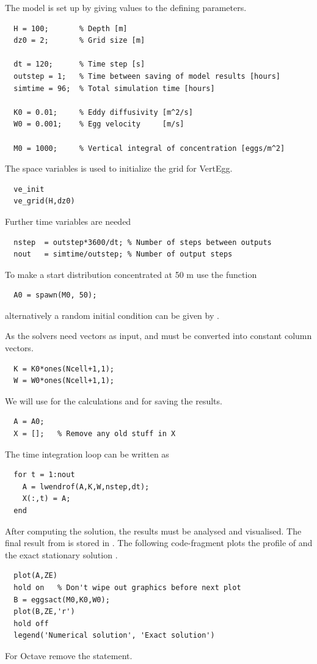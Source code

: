 The model is set up by giving values to the defining  parameters.

\begin{verbatim}
  H = 100;       % Depth [m] 
  dz0 = 2;       % Grid size [m]

  dt = 120;      % Time step [s]
  outstep = 1;   % Time between saving of model results [hours]
  simtime = 96;  % Total simulation time [hours] 
 
  K0 = 0.01;     % Eddy diffusivity [m^2/s]
  W0 = 0.001;    % Egg velocity     [m/s] 
 
  M0 = 1000;     % Vertical integral of concentration [eggs/m^2] 
\end{verbatim}

The space variables is used to initialize the grid for VertEgg.
\begin{verbatim}
  ve_init 
  ve_grid(H,dz0)
\end{verbatim}
Further time variables are needed
\begin{verbatim}
  nstep  = outstep*3600/dt; % Number of steps between outputs 
  nout   = simtime/outstep; % Number of output steps
\end{verbatim}
To make a start distribution concentrated at 50 m use the 
function
\begin{verbatim}
  A0 = spawn(M0, 50);
\end{verbatim}
alternatively a random initial condition can be given by 
.

As the solvers need vectors as input,  and  must
be converted into constant column vectors.
\begin{verbatim}
  K = K0*ones(Ncell+1,1);
  W = W0*ones(Ncell+1,1); 
\end{verbatim}
We will use  for the calculations and  for saving
the results.
\begin{verbatim}
  A = A0;   
  X = [];   % Remove any old stuff in X 
\end{verbatim}
The time integration loop can be written as
\begin{verbatim}
  for t = 1:nout 
    A = lwendrof(A,K,W,nstep,dt); 
    X(:,t) = A; 
  end
\end{verbatim}

After computing the solution, the results must be analysed and
visualised. The final result from  is stored in .
The following code-fragment plots
the profile of  and the exact stationary solution .
\begin{verbatim}
  plot(A,ZE) 
  hold on   % Don't wipe out graphics before next plot
  B = eggsact(M0,K0,W0); 
  plot(B,ZE,'r') 
  hold off 
  legend('Numerical solution', 'Exact solution')
\end{verbatim}
For Octave remove the  statement.

